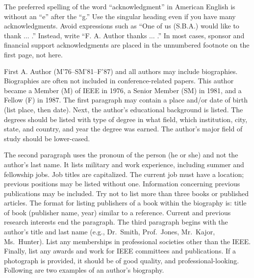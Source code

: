 \documentclass{ieeeaccess}
\begin{document}
The preferred spelling of the word ``acknowledgment'' in American English is 
without an ``e'' after the ``g.'' Use the singular heading even if you have 
many acknowledgments. Avoid expressions such as ``One of us (S.B.A.) would 
like to thank $\ldots$ .'' Instead, write ``F. A. Author thanks $\ldots$ .'' In most 
cases, sponsor and financial support acknowledgments are placed in the 
unnumbered footnote on the first page, not here.






\begin{IEEEbiography}{First A. Author} (M'76--SM'81--F'87) and all authors may include 
biographies. Biographies are often not included in conference-related
papers. This author became a Member (M) of IEEE in 1976, a Senior
Member (SM) in 1981, and a Fellow (F) in 1987. The first paragraph may
contain a place and/or date of birth (list place, then date). Next,
the author's educational background is listed. The degrees should be
listed with type of degree in what field, which institution, city,
state, and country, and year the degree was earned. The author's major
field of study should be lower-cased. 

The second paragraph uses the pronoun of the person (he or she) and not the 
author's last name. It lists military and work experience, including summer 
and fellowship jobs. Job titles are capitalized. The current job must have a 
location; previous positions may be listed 
without one. Information concerning previous publications may be included. 
Try not to list more than three books or published articles. The format for 
listing publishers of a book within the biography is: title of book 
(publisher name, year) similar to a reference. Current and previous research 
interests end the paragraph. The third paragraph begins with the author's 
title and last name (e.g., Dr.\ Smith, Prof.\ Jones, Mr.\ Kajor, Ms.\ Hunter). 
List any memberships in professional societies other than the IEEE. Finally, 
list any awards and work for IEEE committees and publications. If a 
photograph is provided, it should be of good quality, and 
professional-looking. Following are two examples of an author's biography.
\end{IEEEbiography}
\end{document}
